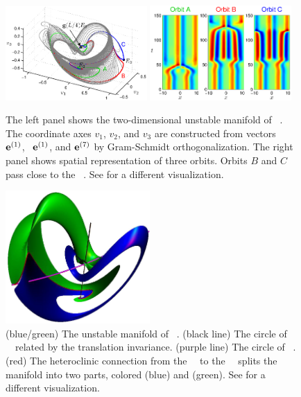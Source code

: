 \begin{figure}[h]
\begin{center}
\includegraphics[width=0.48\textwidth]{figs/ks22_E2_manifold.eps}%
\includegraphics[width=0.48\textwidth]{figs/ks22_E2_orbits.eps}
\end{center}
\caption{
The left panel shows the two-dimensional
unstable manifold of \eqv\ . The coordinate axes
$v_1$, $v_2$, and $v_3$ are constructed from vectors
\Re\, ${\mathbf e}^{(1)}$, \Im\, ${\mathbf e}^{(1)}$, and ${\mathbf e}^{(7)}$
by Gram-Schmidt orthogonalization.
The right panel shows spatial representation of three orbits. Orbits
$B$ and $C$ pass close to the \eqv\ . See
 for a different visualization.
       }
\label{f:KS22E2man}
\end{figure}


\begin{figure}[t]
\begin{center}
\includegraphics[height=2in]{figs/ks22manifold1.eps}
\end{center}
\caption{
    (blue/green) The unstable manifold of ~\eqv.
    (black line) The circle of ~\eqva\
related by the translation invariance.
(purple line) The circle  of ~\eqva.
(red) The heteroclinic connection
from the ~\eqv\ to the ~\eqv\ splits
the manifold into two parts,
colored (blue) and (green).  See
 for a different visualization.
        }
\label{f:KS22Manifold}
\end{figure}

